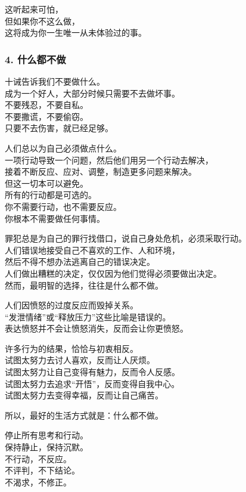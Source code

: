 \documentclass[
]{article}
\begin{document}
这听起来可怕，\\
但如果你不这么做，\\
这将成为你一生唯一从未体验过的事。

\subsubsection{4. 什么都不做}\label{4-ux4ec0ux4e48ux90fdux4e0dux505a}

十诫告诉我们不要做什么。\\
成为一个好人，大部分时候只需要不去做坏事。\\
不要残忍，不要自私。\\
不要撒谎，不要偷窃。\\
只要不去伤害，就已经足够。

人们总以为自己必须做点什么。\\
一项行动导致一个问题，然后他们用另一个行动去解决，\\
接着不断反应、应对、调整，制造更多问题来解决。\\
但这一切本可以避免。\\
所有的行动都是可选的。\\
你不需要行动，也不需要反应。\\
你根本不需要做任何事情。

罪犯总是为自己的罪行找借口，说自己身处危机，必须采取行动。\\
人们错误地接受自己不喜欢的工作、人和环境，\\
然后不得不想办法逃离自己的错误决定。\\
人们做出糟糕的决定，仅仅因为他们觉得必须要做出决定。\\
然而，最明智的选择，往往是什么都不做。

人们因愤怒的过度反应而毁掉关系。\\
``发泄情绪''或``释放压力''这些比喻是错误的。\\
表达愤怒并不会让愤怒消失，反而会让你更愤怒。

许多行为的结果，恰恰与初衷相反。\\
试图太努力去讨人喜欢，反而让人厌烦。\\
试图太努力让自己变得有魅力，反而令人反感。\\
试图太努力去追求``开悟''，反而变得自我中心。\\
试图太努力去变得幸福，反而让自己痛苦。

所以，最好的生活方式就是：什么都不做。

停止所有思考和行动。\\
保持静止，保持沉默。\\
不行动，不反应。\\
不评判，不下结论。\\
不渴求，不修正。
\end{document}
